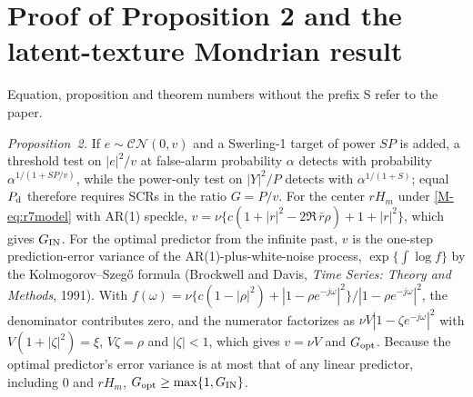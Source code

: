\documentclass[10pt]{article}
\begin{document}
\section{Proof of Proposition 2 and the latent-texture Mondrian result}
Equation, proposition and theorem numbers without the prefix S refer to the paper.

\emph{Proposition~2.} If $e\sim\mathcal{CN}(0,v)$ and a Swerling-1 target of power $SP$ is added, a threshold test on $|e|^2/v$ at false-alarm probability $\alpha$ detects with probability $\alpha^{1/(1+SP/v)}$, while the power-only test on $|Y|^2/P$ detects with $\alpha^{1/(1+S)}$; equal $P_{\rm d}$ therefore requires SCRs in the ratio $G=P/v$. For the center $rH_m$ under \eqref{M-eq:r7model} with AR(1) speckle, $v=\nu\{c(1+|r|^2-2\Re\,\bar r\rho)+1+|r|^2\}$, which gives $G_{\rm IN}$. For the optimal predictor from the infinite past, $v$ is the one-step prediction-error variance of the AR(1)-plus-white-noise process, $\exp\{\int\log f\}$ by the Kolmogorov--Szeg\H{o} formula (Brockwell and Davis, \emph{Time Series: Theory and Methods}, 1991). With $f(\omega)=\nu\{c(1-|\rho|^2)+|1-\rho e^{-j\omega}|^2\}/|1-\rho e^{-j\omega}|^2$, the denominator contributes zero, and the numerator factorizes as $\nu V|1-\zeta e^{-j\omega}|^2$ with $V(1+|\zeta|^2)=\xi$, $V\zeta=\rho$ and $|\zeta|<1$, which gives $v=\nu V$ and $G_{\rm opt}$. Because the optimal predictor's error variance is at most that of any linear predictor, including $0$ and $rH_m$, $G_{\rm opt}\ge\max\{1,G_{\rm IN}\}$.
\end{document}
